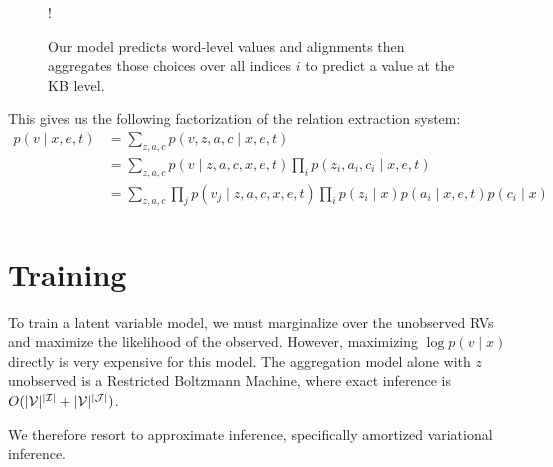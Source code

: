 \documentclass[12pt]{article}
\begin{document}
\begin{figure}[h]
\begin{center}
\resizebox {.3\columnwidth} {!} {
} %
\end{center}
\caption{Our model predicts word-level values and alignments
then aggregates those choices over all indices $i$ to
predict a value at the KB level.
}
\label{fig:infmodel}
\end{figure}

This gives us the following factorization of the relation extraction system:
\begin{equation}
\label{eqn:prob}
\begin{aligned}
p(v \mid x,e,t) &= \sum_{z,a,c} p(v,z,a,c\mid x,e,t)\\
&= \sum_{z,a,c} p(v\mid z,a,c,x,e,t) \prod_i p(z_i, a_i, c_i\mid x,e,t)\\
&= \sum_{z,a,c} \prod_j p(v_j\mid z,a,c,x,e,t) \prod_i p(z_i\mid x)p(a_i\mid x,e,t)p(c_i\mid x)\\
\end{aligned}
\end{equation}
\section{Training}
To train a latent variable model, we must marginalize over the unobserved RVs
and maximize the likelihood of the observed.
However, maximizing $\log p(v \mid x)$ directly is very expensive for this model.
The aggregation model alone with $z$ unobserved is a Restricted Boltzmann Machine,
where exact inference is $O(|\mathcal{V}|^{|\mathcal{I}|} + |\mathcal{V}|^{|\mathcal{J}|})$.

We therefore resort to approximate inference,
specifically amortized variational inference.
\end{document}
